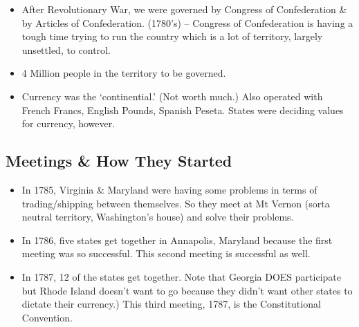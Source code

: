 \documentclass{article}
\begin{document}
  \begin{itemize}
    \item After Revolutionary War, we were governed by Congress of Confederation \& by Articles of Confederation. (1780's) -- Congress of Confederation is having a tough time trying to run the country which is a lot of territory, largely unsettled, to control. 
    \item 4 Million people in the territory to be governed.
    \item Currency was the `continential.' (Not worth much.) Also operated with French Francs, English Pounds, Spanish Peseta. States were deciding values for currency, however.
  \end{itemize}
  
  \subsection{Meetings \& How They Started}
    \begin{itemize}
      \item In 1785, Virginia \& Maryland were having some problems in terms of trading/shipping between themselves. So they meet at Mt Vernon (sorta neutral territory, Washington's house) and solve their problems.
      \item In 1786, five states get together in Annapolis, Maryland because the first meeting was so successful. This second meeting is successful as well.
      \item In 1787, 12 of the states get together. Note that Georgia DOES participate but Rhode Island doesn't want to go because they didn't want other states to dictate their currency.) This third meeting, 1787, is the Constitutional Convention.
    \end{itemize}
\end{document}
